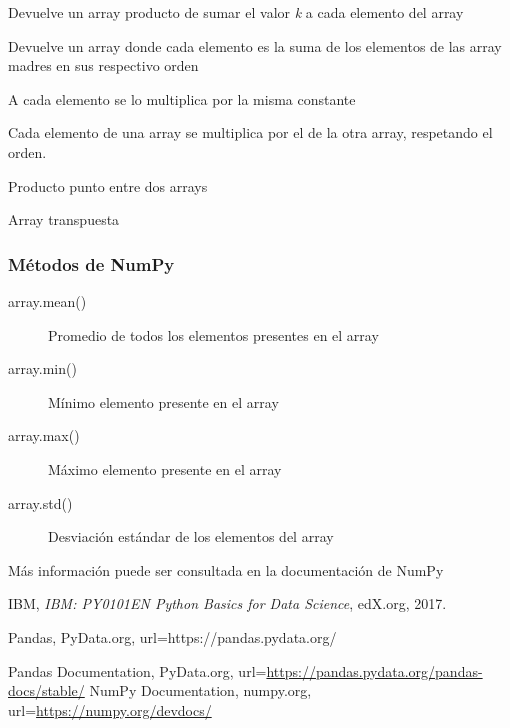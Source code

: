 \documentclass[10pt,a4paper]{article}
\begin{document}
\begin{description}[
align=left,
labelindent=1em ,
labelwidth=4cm,
labelsep*=0.1cm,
leftmargin =!
]
\item [k + array] Devuelve un array producto de sumar el valor \emph{k} a cada elemento del array
\item [array1 + array2] Devuelve un array donde cada elemento es la suma de los elementos de las array madres en sus respectivo orden
\item [k * array] A cada elemento se lo multiplica por la misma constante
\item [array1 * array2] Cada elemento de una array se multiplica por el de la otra array, respetando el orden.
\item [np.dot(array1, array2)] Producto punto entre dos arrays
\item [array.T] Array transpuesta
\end{description}


\subsubsection{Métodos de NumPy}
\begin{description}
\item [array.mean()] Promedio de todos los elementos presentes en el array
\item [array.min()] Mínimo elemento presente en el array
\item [array.max()] Máximo elemento presente en el array
\item [array.std()] Desviación estándar de los elementos del array
\end{description}

Más información puede ser consultada en la documentación de NumPy \cite{numpyDoc}
\begin{thebibliography}{9}

IBM,
\textit{ IBM: PY0101EN Python Basics for Data Science},
edX.org,
2017.

Pandas,
PyData.org,
url=https://pandas.pydata.org/

Pandas Documentation,
PyData.org,
url=\url{https://pandas.pydata.org/pandas-docs/stable/}
NumPy Documentation,
numpy.org,
url=\url{https://numpy.org/devdocs/}

\end{thebibliography}
\end{document}
